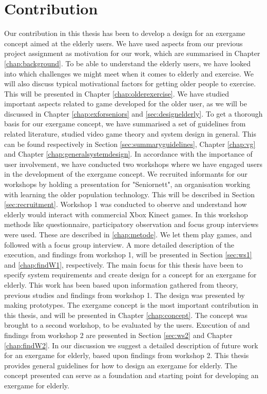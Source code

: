 \section{Contribution}
Our contribution in this thesis has been to develop a design for an exergame concept aimed at the elderly users. We have used aspects from our previous project assignment as motivation for our work, which are summarised in Chapter \ref{chap:background}. To be able to understand the elderly users, we have looked into which challenges we might meet when it comes to elderly and exercise. We will also discuss typical motivational factors for getting older people to exercise. This will be presented in Chapter \ref{chap:olderexercise}. We have studied important aspects related to game developed for the older user, as we will be discussed in Chapter \ref{chap:exforseniors} and \ref{sec:designelderly}. To get a thorough basis for our exergame concept, we have summarised a set of guidelines from related literature, studied video game theory and system design in general. This can be found respectively in Section \ref{sec:summaryguidelines}, Chapter \ref{chap:vg} and Chapter \ref{chap:generalsystemdesign}. In accordance with the importance of user involvement, we have conducted two workshops where we have engaged users in the development of the exergame concept. We recruited informants for our workshops by holding a presentation for "Seniornett", an organisation working with learning the older population technology. This will be described in Section \ref{sec:recruitment}. Workshop 1 was conducted to observe and understand how elderly would interact with commercial Xbox Kinect games. In this workshop methods like questionnaire, participatory observation and focus group interviews were used. These are described in \ref{chap:metode}. We let them play games, and followed with a focus group interview. A more detailed description of the execution, and findings from workshop 1, will be presented in Section \ref{sec:ws1} and \ref{chap:findW1}, respectively. The main focus for this thesis have been to specify system requirements and create design for a concept for an exergame for elderly. This work has been based upon information gathered from theory, previous studies and findings from workshop 1. The design was presented by making prototypes. The exergame concept is the most important contribution in this thesis, and will be presented in Chapter \ref{chap:concept}. The concept was brought to a second workshop, to be evaluated by the users. Execution of and findings from workshop 2 are presented in Section \ref{sec:ws2} and Chapter \ref{chap:findW2}. In our discussion we suggest a detailed description of future work for an exergame for elderly, based upon findings from workshop 2. This thesis provides general guidelines for how to design an exergame for elderly. The concept presented can serve as a foundation and starting point for developing an exergame for elderly.     

